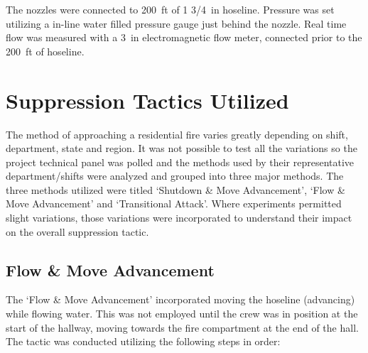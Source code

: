 \documentclass[12pt,oneside]{book}
\begin{document}
The nozzles were connected to 200~ft of 1 3/4~in hoseline. Pressure was set utilizing a in-line water filled pressure gauge just behind the nozzle. Real time flow was measured with a 3~in electromagnetic flow meter, connected prior to the 200~ft of hoseline. %


\clearpage

\section{Suppression Tactics Utilized}

The method of approaching a residential fire varies greatly depending on shift, department, state and region. It was not possible to test all the variations so the project technical panel was polled and the methods used by their representative department/shifts were analyzed and grouped into three major methods. The three methods utilized were titled `Shutdown \& Move Advancement', `Flow \& Move Advancement' and `Transitional Attack'. Where experiments permitted slight variations, those variations were incorporated to understand their impact on the overall suppression tactic.


\subsection{Flow \& Move Advancement}
The `Flow \& Move Advancement' incorporated moving the hoseline (advancing) while flowing water. This was not employed until the crew was in position at the start of the hallway, moving towards the fire compartment at the end of the hall. The tactic was conducted utilizing the following steps in order:
\end{document}
